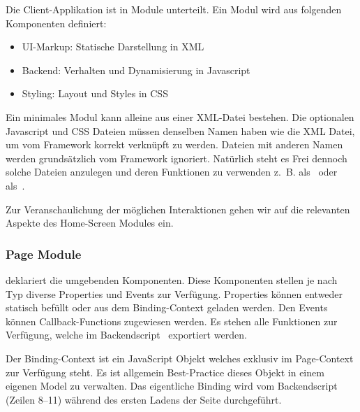 Die Client-Applikation ist in Module unterteilt.
Ein Modul wird aus folgenden Komponenten definiert:
\begin{itemize}
    \item UI-Markup: Statische Darstellung in XML
    \item Backend: Verhalten und Dynamisierung in Javascript
    \item Styling: Layout und Styles in CSS
\end{itemize}

Ein minimales Modul kann alleine aus einer XML-Datei bestehen.
Die optionalen Javascript und CSS Dateien müssen denselben Namen haben wie die XML Datei, um vom Framework korrekt verknüpft zu werden.
Dateien mit anderen Namen werden grundsätzlich vom Framework ignoriert.
Natürlich steht es Frei dennoch solche Dateien anzulegen und deren Funktionen zu verwenden z.~B. als~\emph{} oder als~\emph{}.

Zur Veranschaulichung der möglichen Interaktionen gehen wir auf die relevanten Aspekte des Home-Screen Modules ein.

\subsubsection*{Page Module}


\emph{} deklariert die umgebenden Komponenten.
Diese Komponenten stellen je nach Typ diverse Properties und Events zur Verfügung.
Properties können entweder statisch befüllt oder aus dem Binding-Context geladen werden.
Den Events können Callback-Functions zugewiesen werden.
Es stehen alle Funktionen zur Verfügung, welche im Backendscript~\emph{} exportiert werden.



Der Binding-Context ist ein JavaScript Objekt welches exklusiv im Page-Context zur Verfügung steht.
Es ist allgemein Best-Practice dieses Objekt in einem eigenen Model zu verwalten.
Das eigentliche Binding wird vom Backendscript~\emph{} (Zeilen 8--11) während des ersten Ladens der Seite durchgeführt.



